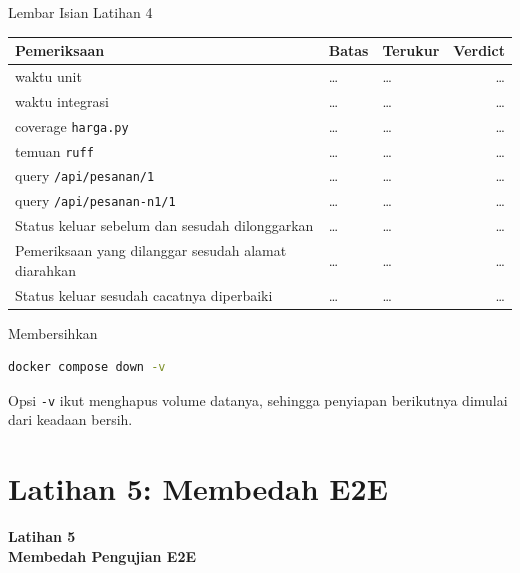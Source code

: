 \documentclass[aspectratio=169, table, 12pt]{beamer}
\begin{document}
\begin{frame}{{\Large Lembar Isian Latihan 4}}
  \vspace{4pt}
  \centering
  {\footnotesize
  \begin{tabularx}{\textwidth}{Yllr}
    \hline
    \textbf{Pemeriksaan} & \textbf{Batas} & \textbf{Terukur} & \textbf{Verdict} \\
    \hline
    waktu unit & \dots & \dots & \dots \\
    \hline
    waktu integrasi & \dots & \dots & \dots \\
    \hline
    coverage \texttt{harga.py} & \dots & \dots & \dots \\
    \hline
    temuan \texttt{ruff} & \dots & \dots & \dots \\
    \hline
    query \texttt{/api/pesanan/1} & \dots & \dots & \dots \\
    \hline
    query \texttt{/api/pesanan-n1/1} & \dots & \dots & \dots \\
    \hline
    Status keluar sebelum dan sesudah dilonggarkan & \dots & \dots & \dots \\
    \hline
    Pemeriksaan yang dilanggar sesudah alamat diarahkan & \dots & \dots & \dots \\
    \hline
    Status keluar sesudah cacatnya diperbaiki & \dots & \dots & \dots \\
    \hline
  \end{tabularx}}
\end{frame}

\begin{frame}[fragile]{{\Large Membersihkan}}
  \vspace{2pt}
\begin{lstlisting}[language=bash]
docker compose down -v
\end{lstlisting}
  \vspace{6pt}
  {\small Opsi \texttt{-v} ikut menghapus volume datanya, sehingga penyiapan
  berikutnya dimulai dari keadaan bersih.}
\end{frame}

\section{Latihan 5: Membedah E2E}

\begin{frame}{\hfill}
  \centering
  \Huge{\textbf{Latihan 5\\Membedah Pengujian E2E}}
\end{frame}
\end{document}
